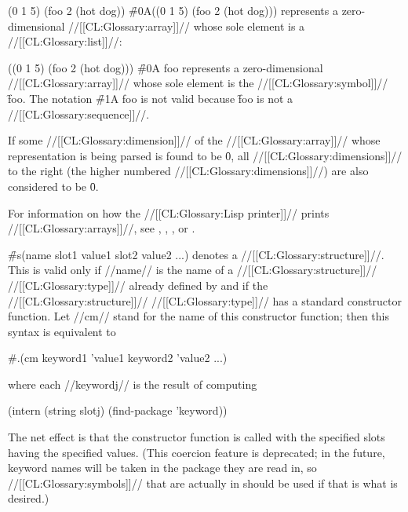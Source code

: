 \code
 (0 1 5) (foo 2 (hot dog))
\endcode
\f{\#0A((0 1 5) (foo 2 (hot dog)))} represents a zero-dimensional
//[[CL:Glossary:array]]// whose sole element is a //[[CL:Glossary:list]]//:

\code
 ((0 1 5) (foo 2 (hot dog)))
\endcode
\f{\#0A foo} represents 
a zero-dimensional //[[CL:Glossary:array]]// whose sole element is the 
//[[CL:Glossary:symbol]]// \f{foo}.
The notation \f{\#1A foo} is not valid because \f{foo} is
not a //[[CL:Glossary:sequence]]//.

If some //[[CL:Glossary:dimension]]// of the //[[CL:Glossary:array]]//
whose representation is being parsed is found to be \f{0},
all //[[CL:Glossary:dimensions]]// to the right 
(\ie the higher numbered //[[CL:Glossary:dimensions]]//)
are also considered to be \f{0}.

For information on how the //[[CL:Glossary:Lisp printer]]// prints //[[CL:Glossary:arrays]]//,
see \secref\PrintingStrings,
    \secref\PrintingBitVectors,
    \secref\PrintingOtherVectors,
 or \secref\PrintingOtherArrays.

\endsubsubsection%




\f{\#s(name slot1 value1 slot2 value2 ...)}
denotes a //[[CL:Glossary:structure]]//.  This is valid only if //name// is the name
of a //[[CL:Glossary:structure]]// //[[CL:Glossary:type]]// already defined by  
and if the //[[CL:Glossary:structure]]// //[[CL:Glossary:type]]// has a standard constructor function.
Let //cm// stand for the name of this constructor function;
then this syntax is equivalent to

\code
 #.(cm keyword1 'value1 keyword2 'value2 ...)
\endcode

where each //keywordj// is the result of computing

\code
 (intern (string slotj) (find-package 'keyword))
\endcode
    
The net effect is that the constructor function is called with the specified
slots having the specified values. 
(This coercion feature is deprecated; in the future, keyword names will 
 be taken in the package they are read in, so //[[CL:Glossary:symbols]]// that are 
 actually in  should be used if that is what is desired.)


